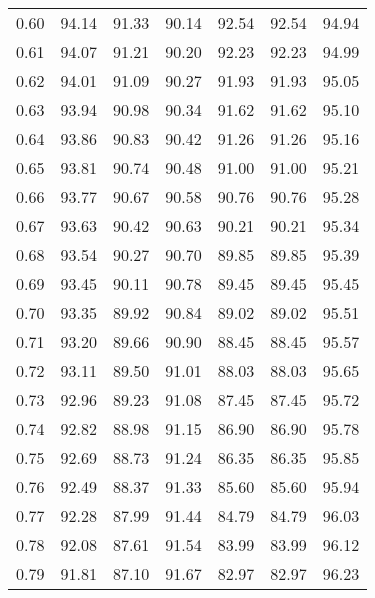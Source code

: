 \begin{tabular}{|c|c|c|c|c|c|c|}
      0.60 &     94.14 &     91.33 &      90.14 &   92.54 &      92.54 &         94.94 \\
      0.61 &     94.07 &     91.21 &      90.20 &   92.23 &      92.23 &         94.99 \\
      0.62 &     94.01 &     91.09 &      90.27 &   91.93 &      91.93 &         95.05 \\
      0.63 &     93.94 &     90.98 &      90.34 &   91.62 &      91.62 &         95.10 \\
      0.64 &     93.86 &     90.83 &      90.42 &   91.26 &      91.26 &         95.16 \\
      0.65 &     93.81 &     90.74 &      90.48 &   91.00 &      91.00 &         95.21 \\
      0.66 &     93.77 &     90.67 &      90.58 &   90.76 &      90.76 &         95.28 \\
      0.67 &     93.63 &     90.42 &      90.63 &   90.21 &      90.21 &         95.34 \\
      0.68 &     93.54 &     90.27 &      90.70 &   89.85 &      89.85 &         95.39 \\
      0.69 &     93.45 &     90.11 &      90.78 &   89.45 &      89.45 &         95.45 \\
      0.70 &     93.35 &     89.92 &      90.84 &   89.02 &      89.02 &         95.51 \\
      0.71 &     93.20 &     89.66 &      90.90 &   88.45 &      88.45 &         95.57 \\
      0.72 &     93.11 &     89.50 &      91.01 &   88.03 &      88.03 &         95.65 \\
      0.73 &     92.96 &     89.23 &      91.08 &   87.45 &      87.45 &         95.72 \\
      0.74 &     92.82 &     88.98 &      91.15 &   86.90 &      86.90 &         95.78 \\
      0.75 &     92.69 &     88.73 &      91.24 &   86.35 &      86.35 &         95.85 \\
      0.76 &     92.49 &     88.37 &      91.33 &   85.60 &      85.60 &         95.94 \\
      0.77 &     92.28 &     87.99 &      91.44 &   84.79 &      84.79 &         96.03 \\
      0.78 &     92.08 &     87.61 &      91.54 &   83.99 &      83.99 &         96.12 \\
      0.79 &     91.81 &     87.10 &      91.67 &   82.97 &      82.97 &         96.23 \\

\end{tabular}

